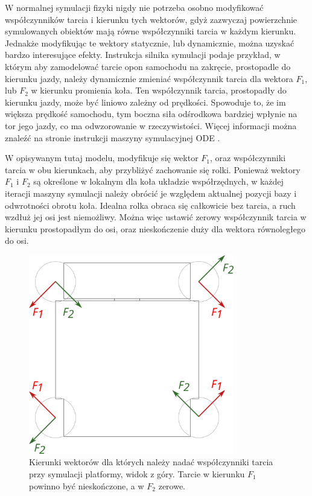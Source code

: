 		W normalnej symulacji fizyki nigdy nie potrzeba osobno modyfikować współczynników tarcia i kierunku tych wektorów, 
		gdyż zazwyczaj powierzchnie symulowanych obiektów mają równe współczynniki tarcia w każdym kierunku.
		Jednakże modyfikując te wektory statycznie, lub dynamicznie, można uzyskać bardzo interesujące efekty.
		Instrukcja silnika symulacji podaje przykład, w którym aby zamodelować tarcie opon samochodu na zakręcie, prostopadle do kierunku jazdy, 
		należy dynamicznie zmieniać współczynnik tarcia dla wektora $F_1$, lub $F_2$ w kierunku promienia koła.
		Ten współczynnik tarcia, prostopadły do kierunku jazdy, może być liniowo zależny od prędkości.
		Spowoduje to, że im większa prędkość samochodu, tym boczna siła odśrodkowa bardziej wpłynie na tor jego jazdy, co ma odwzorowanie w rzeczywistości.
		Więcej informacji można znaleźć na stronie instrukcji maszyny symulacyjnej ODE \cite{ode_contact}.

		W opisywanym tutaj modelu, modyfikuje się wektor $F_1$, oraz współczynniki tarcia w obu kierunkach, aby przybliżyć zachowanie się rolki.
		Ponieważ wektory $F_1$ i $F_2$ są określone w lokalnym dla koła układzie współrzędnych, 
		w każdej iteracji maszyny symulacji należy obrócić je względem aktualnej pozycji bazy i odwrotności obrotu koła.
		Idealna rolka obraca się całkowicie bez tarcia, a ruch wzdłuż jej osi jest niemożliwy.
		Można więc ustawić zerowy współczynnik tarcia w kierunku prostopadłym do osi, oraz nieskończenie duży dla wektora równoległego do osi.

		\begin{figure}[H]
		\centering
		\includegraphics[width=0.8\textwidth]{graphics/base_vects.pdf}
		\caption{Kierunki wektorów dla których należy nadać współczynniki tarcia przy symulacji platformy, widok z góry. Tarcie w kierunku $F_1$ powinno być nieskończone, a w $F_2$ zerowe.}
		\end{figure} 


